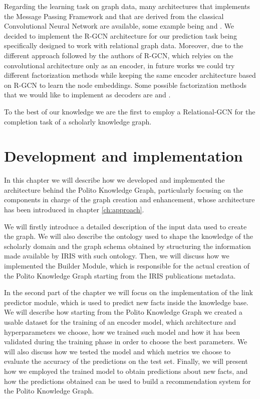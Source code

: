 \documentclass[%
    corpo=13.5pt,
    twoside,
    oldstyle,
    tipotesi=magistrale,
    greek,
    evenboxes
]{toptesi}
\begin{document}
Regarding the learning task on graph data, many architectures that implements
the Message Passing Framework\cite{gilmer2017} and that are derived from the
classical Convolutional Neural Network are available, some example being
\cite{defferrard2016} and \cite{duvenaud2015}.
We decided to implement the R-GCN architecture for our prediction task
being specifically designed to work with relational graph data.
Moreover, due to the different approach followed by the authors of R-GCN, which
relyies on the convolutional architecture only as an encoder, in future works
we could try different factorization methods while keeping the same encoder
architecture based on R-GCN to learn the node embeddings.
Some possible factorization methods that we would like to implement
as decoders are \cite{kazemi2018} and \cite{trouillon2016}.

To the best of our knowledge we are the first to employ a
Relational-GCN for the completion task of a scholarly knowledge graph.




\chapter{Development and implementation}

In this chapter we will describe how we developed and implemented the
architecture behind the Polito Knowledge Graph, particularly focusing
on the components in charge of the graph creation and enhancement, whose
architecture has been introduced in chapter \ref{ch:approach}.

We will firstly introduce a detailed description of the input data used to
create the graph. We will also describe the ontology used to shape the
knowledge of the scholarly domain and the graph schema obtained by structuring
the information made available by IRIS with such ontology.
Then, we will discuss how we implemented the Builder Module, which is
responsible for the actual creation of the Polito Knowledge Graph starting
from the IRIS publications metadata.

In the second part of the chapter we will focus on the implementation of the
link predictor module, which is used to predict new facts inside the knowledge
base.
We will describe how starting from the Polito Knowledge Graph we created
a usable dataset for the training of an encoder model, which
architecture and hyperparameters we choose, how we trained such model and
how it has been validated during the training phase in order to choose the
best parameters.
We will also discuss how we tested the model and which metrics we choose
to evaluate the accuracy of the predictions on the test set.
Finally, we will present how we employed the trained model to obtain
predictions about new facts, and how the predictions obtained
can be used to build a recommendation system for the Polito Knowledge Graph.
\end{document}
